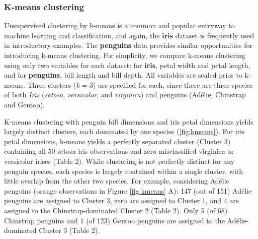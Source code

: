 \hypertarget{k-means-clustering}{%
\subsubsection{K-means clustering}\label{k-means-clustering}}

Unsupervised clustering by k-means is a common and popular entryway to
machine learning and classification, and again, the \textbf{iris}
dataset is frequently used in introductory examples. The
\textbf{penguins} data provides similar opportunities for introducing
k-means clustering. For simplicity, we compare k-means clustering using
only two variables for each dataset: for \textbf{iris}, petal width and
petal length, and for \textbf{penguins}, bill length and bill depth. All
variables are scaled prior to k-means. Three clusters (\emph{k} = 3) are
specified for each, since there are three species of both \emph{Iris}
(\emph{setosa}, \emph{versicolor}, and \emph{virginica}) and penguins
(Adélie, Chinstrap and Gentoo).

K-means clustering with penguin bill dimensions and iris petal
dimensions yields largely distinct clusters, each dominated by one
species (\ref{fig:kmeans}). For iris petal dimensions, k-means yields a
perfectly separated cluster (Cluster 3) containing all 50 setosa iris
observations and zero misclassified virginica or versicolor irises
(Table 2). While clustering is not perfectly distinct for any penguin
species, each species is largely contained within a single cluster, with
little overlap from the other two species. For example, considering
Adélie penguins (orange observations in Figure \ref{fig:kmeans} A): 147
(out of 151) Adélie penguins are assigned to Cluster 3, zero are
assigned to Cluster 1, and 4 are assigned to the Chinstrap-dominated
Cluster 2 (Table 2). Only 5 (of 68) Chinstrap penguins and 1 (of 123)
Gentoo penguins are assigned to the Adélie-dominated Cluster 3 (Table
2).

